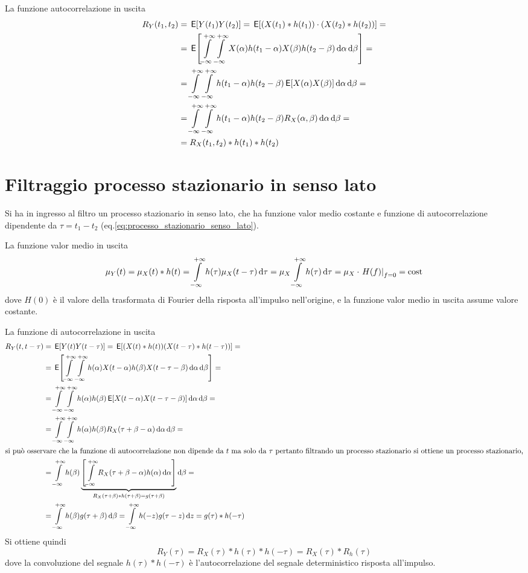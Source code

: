 La funzione autocorrelazione in uscita
\begin{equation}
\begin{split}
R_Y(t_1,t_2)&=\E{Y(t_1)Y(t_2)}=\E{(X(t_1)\ast h(t_1))\cdot(X(t_2)\ast h(t_2))}=\\
&=\E{\intinf{\intinf{X(\alpha)h(t_1-\alpha)X(\beta)h(t_2-\beta)}{\alpha}}{\beta}}=\\
&=\intinf{\intinf{h(t_1-\alpha)h(t_2-\beta)\E{X(\alpha)X(\beta)}}{\alpha}}{\beta}=\\
&=\intinf{\intinf{h(t_1-\alpha)h(t_2-\beta)R_X(\alpha,\beta)}{\alpha}}{\beta}=\\
&=R_X(t_1,t_2)\ast h(t_1)\ast h(t_2)
\end{split}
\end{equation}

\section{Filtraggio processo stazionario in senso lato}\label{sec:filtraggio_processo_SSL}
Si ha in ingresso al filtro un processo stazionario in senso lato, che ha funzione valor medio costante e funzione di autocorrelazione dipendente da $\tau=t_1-t_2$ (eq.\ref{eq:processo_stazionario_senso_lato}).

La funzione valor medio in uscita
\begin{equation}
\mu_Y(t)=\mu_X(t)\ast h(t)=\int\limits_{-\infty}^{+\infty}{h(\tau)\mu_X(t-\tau)}{\,\mathop{}\!\mathrm{d}{\tau}}=\mu_X\int\limits_{-\infty}^{+\infty}{h(\tau)}{\,\mathop{}\!\mathrm{d}{\tau}}=\mu_X\cdot \left.{H(f)}\right\rvert_{f=0}=\text{cost}
\end{equation}
dove $H(0)$ è il valore della trasformata di Fourier della risposta all'impulso nell'origine, e la funzione valor medio in uscita assume valore costante.

La funzione di autocorrelazione in uscita
\begin{equation}\begin{split}
R_Y(t,t-\tau)&=\E{Y(t)Y(t-\tau)}=\E{(X(t)\ast h(t))(X(t-\tau)\ast h(t-\tau))}=\\&=\E{\intinf{\intinf{h(\alpha)X(t-\alpha)h(\beta)X(t-\tau-\beta)}{\alpha}}{\beta}}=\\&=\intinf{\intinf{h(\alpha)h(\beta)\E{X(t-\alpha)X(t-\tau-\beta)}}{\alpha}}{\beta}=\\&=\intinf{\intinf{h(\alpha)h(\beta)R_X(\tau+\beta-\alpha)}{\alpha}}{\beta}=\\
\intertext{si può osservare che la funzione di autocorrelazione non dipende da $t$ ma solo da $\tau$ pertanto filtrando un processo stazionario si ottiene un processo stazionario,}
&=\intinf{h(\beta)\underbrace{\left[\intinf{R_X(\tau+\beta-\alpha)h(\alpha)}{\alpha}\right]}_{R_X(\tau+\beta)\ast h(\tau+\beta)=g(\tau+\beta)}}{\beta}=\\
&=\intinf{h(\beta)g(\tau+\beta)}{\beta}=\intinf{h(-z)g(\tau-z)}{z}=g(\tau)\ast h(-\tau)
\end{split}
\end{equation}
Si ottiene quindi
\begin{equation}
R_Y(\tau)=R_X(\tau)\ast h(\tau)\ast h(-\tau)=R_X(\tau)\ast R_h(\tau)
\end{equation}
dove la convoluzione del segnale $h(\tau)\ast h(-\tau)$ è l'autocorrelazione del segnale deterministico risposta all'impulso.

